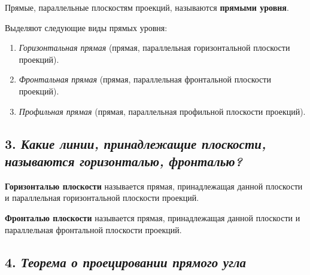 Прямые, параллельные плоскостям проекций, называются {\bf прямыми
уровня}.

Выделяют следующие виды прямых уровня:
\begin{enumerate}
    \item \textit {Горизонтальная прямая} (прямая, параллельная горизонтальной плоскости проекций).
    

    \item \textit {Фронтальная прямая} (прямая, параллельная фронтальной плоскости проекций).


    \item \textit {Профильная прямая} (прямая, параллельная профильной плоскости проекций).


\end{enumerate}


\newpage
\subsection*{3. \textit{Какие линии, принадлежащие плоскости, называются горизонталью, фронталью?}}

\begin{mainQuote}
    
\end{mainQuote}

{\bf Горизонталью плоскости} называется прямая, принадлежащая данной плоскости и параллельная горизонтальной плоскости проекций.


{\bf Фронталью плоскости} называется прямая, принадлежащая данной плоскости и параллельная фронтальной плоскости проекций.



\newpage
\subsection*{4. \textit{Теорема о проецировании прямого угла}}

